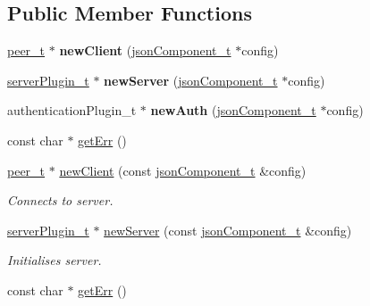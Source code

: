 \subsection*{\-Public \-Member \-Functions}
\begin{DoxyCompactItemize}
\item 
\hypertarget{classi4tCreator_ad4c34805648a02c827b556437311807a}{\hyperlink{classpeer__t}{peer\-\_\-t} $\ast$ {\bfseries new\-Client} (\hyperlink{classjsonComponent__t}{json\-Component\-\_\-t} $\ast$config)}\label{classi4tCreator_ad4c34805648a02c827b556437311807a}

\item 
\hypertarget{classi4tCreator_aa6d68e58616d46a494a06ba4d9f53c41}{\hyperlink{classserverPlugin__t}{server\-Plugin\-\_\-t} $\ast$ {\bfseries new\-Server} (\hyperlink{classjsonComponent__t}{json\-Component\-\_\-t} $\ast$config)}\label{classi4tCreator_aa6d68e58616d46a494a06ba4d9f53c41}

\item 
\hypertarget{classi4tCreator_ac81c674c7efb816a661805b8d99db9a7}{authentication\-Plugin\-\_\-t $\ast$ {\bfseries new\-Auth} (\hyperlink{classjsonComponent__t}{json\-Component\-\_\-t} $\ast$config)}\label{classi4tCreator_ac81c674c7efb816a661805b8d99db9a7}

\item 
const char $\ast$ \hyperlink{classi4tCreator_ae599e7b71bbf593fa7520e77e1a463f5}{get\-Err} ()
\item 
\hyperlink{classpeer__t}{peer\-\_\-t} $\ast$ \hyperlink{classi4tCreator_a641fa57ad67b04e01c34857bcb2e10ae}{new\-Client} (const \hyperlink{classjsonComponent__t}{json\-Component\-\_\-t} \&config)
\begin{DoxyCompactList}\small\item\em \-Connects to server. \end{DoxyCompactList}\item 
\hyperlink{classserverPlugin__t}{server\-Plugin\-\_\-t} $\ast$ \hyperlink{classi4tCreator_a2c1b48aea375785384fdee3d25392a86}{new\-Server} (const \hyperlink{classjsonComponent__t}{json\-Component\-\_\-t} \&config)
\begin{DoxyCompactList}\small\item\em \-Initialises server. \end{DoxyCompactList}\item 
const char $\ast$ \hyperlink{classi4tCreator_ae599e7b71bbf593fa7520e77e1a463f5}{get\-Err} ()
\end{DoxyCompactItemize}


